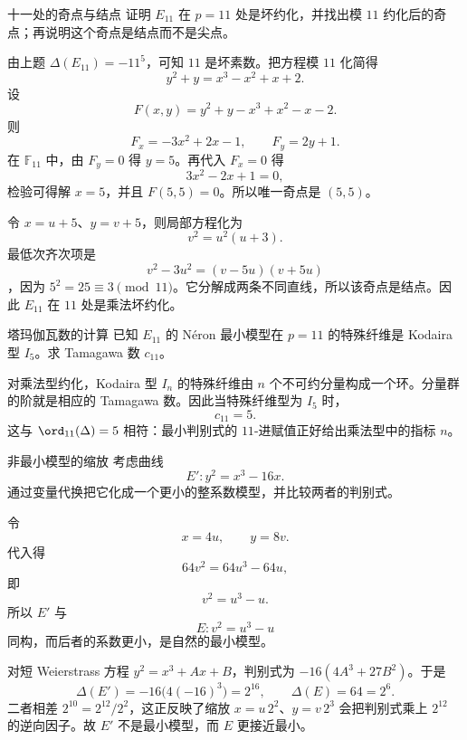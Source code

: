 \begin{problem}{十一处的奇点与结点}
\medium
证明 $E_{11}$ 在 $p=11$ 处是坏约化，并找出模 $11$ 约化后的奇点；再说明这个奇点是结点而不是尖点。
\end{problem}
\begin{solution}
由上题 $\Delta(E_{11})=-11^5$，可知 $11$ 是坏素数。把方程模 $11$ 化简得
\[
y^2+y=x^3-x^2+x+2.
\]
设
\[
F(x,y)=y^2+y-x^3+x^2-x-2.
\]
则
\[
F_x=-3x^2+2x-1,
\qquad
F_y=2y+1.
\]
在 $\mathbb{F}_{11}$ 中，由 $F_y=0$ 得 $y=5$。再代入 $F_x=0$ 得
\[
3x^2-2x+1=0,
\]
检验可得解 $x=5$，并且 $F(5,5)=0$。所以唯一奇点是 $(5,5)$。

令 $x=u+5$、$y=v+5$，则局部方程化为
\[
v^2=u^2(u+3).
\]
最低次齐次项是
\[
v^2-3u^2=(v-5u)(v+5u)
\]
，因为 $5^2=25\equiv 3\pmod{11}$。它分解成两条不同直线，所以该奇点是结点。因此 $E_{11}$ 在 $11$ 处是乘法坏约化。
\end{solution}

\begin{problem}{塔玛伽瓦数的计算}
\medium
已知 $E_{11}$ 的 N\'eron 最小模型在 $p=11$ 的特殊纤维是 Kodaira 型 $I_5$。求 Tamagawa 数 $c_{11}$。
\end{problem}
\begin{solution}
对乘法型约化，Kodaira 型 $I_n$ 的特殊纤维由 $n$ 个不可约分量构成一个环。分量群的阶就是相应的 Tamagawa 数。因此当特殊纤维型为 $I_5$ 时，
\[
c_{11}=5.
\]
这与 $\ord_{11}(\Delta)=5$ 相符：最小判别式的 $11$-进赋值正好给出乘法型中的指标 $n$。
\end{solution}

\begin{problem}{非最小模型的缩放}
\medium
考虑曲线
\[
E': y^2=x^3-16x.
\]
通过变量代换把它化成一个更小的整系数模型，并比较两者的判别式。
\end{problem}
\begin{solution}
令
\[
x=4u,\qquad y=8v.
\]
代入得
\[
64v^2=64u^3-64u,
\]
即
\[
v^2=u^3-u.
\]
所以 $E'$ 与
\[
E: v^2=u^3-u
\]
同构，而后者的系数更小，是自然的最小模型。

对短 Weierstrass 方程 $y^2=x^3+Ax+B$，判别式为 $-16(4A^3+27B^2)$。于是
\[
\Delta(E')=-16\bigl(4(-16)^3\bigr)=2^{16},
\qquad
\Delta(E)=64=2^6.
\]
二者相差 $2^{10}=2^{12}/2^2$，这正反映了缩放 $x=u\,2^2$、$y=v\,2^3$ 会把判别式乘上 $2^{12}$ 的逆向因子。故 $E'$ 不是最小模型，而 $E$ 更接近最小。
\end{solution}

